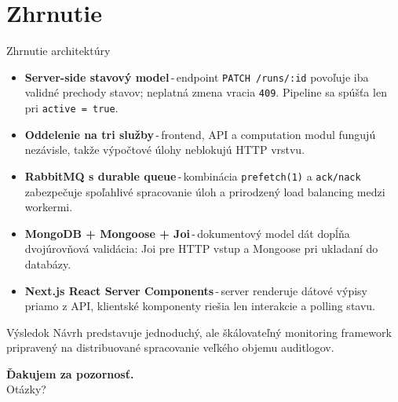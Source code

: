 \documentclass[aspectratio=169,11pt]{beamer}
\begin{document}
\section{Zhrnutie}
\begin{frame}{Zhrnutie architektúry}
	\small
	\begin{itemize}
		\item \textbf{Server-side stavový model}\,-\,endpoint \texttt{PATCH /runs/:id} povoľuje iba validné prechody stavov; neplatná zmena vracia \texttt{409}. Pipeline sa spúšťa len pri \texttt{active = true}.
		
		\item \textbf{Oddelenie na tri služby}\,-\,frontend, API a computation modul fungujú nezávisle, takže výpočtové úlohy neblokujú HTTP vrstvu.
		
		\item \textbf{RabbitMQ s durable queue}\,-\,kombinácia \texttt{prefetch(1)} a \texttt{ack/nack} zabezpečuje spoľahlivé spracovanie úloh a prirodzený load balancing medzi workermi.
		
		\item \textbf{MongoDB + Mongoose + Joi}\,-\,dokumentový model dát dopĺňa dvojúrovňová validácia: Joi pre HTTP vstup a Mongoose pri ukladaní do databázy.
		
		\item \textbf{Next.js React Server Components}\,-\,server renderuje dátové výpisy priamo z API, klientské komponenty riešia len interakcie a polling stavu.
	\end{itemize}
	
	\vfill
	
	\begin{block}{Výsledok}
		Návrh predstavuje jednoduchý, ale škálovateľný monitoring framework pripravený na distribuované spracovanie veľkého objemu auditlogov.
	\end{block}
\end{frame}


\begin{frame}
  \centering
  \vfill
  {\Large \textbf{Ďakujem za pozornosť.}}\\[1em]
  {\large Otázky?}
  \vfill
\end{frame}
\end{document}
